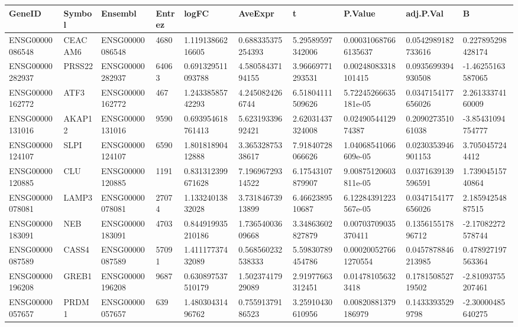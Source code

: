 \begingroup
\tiny
\setlength{\tabcolsep}{2pt}
\renewcommand{\arraystretch}{1.18}
\begin{tabular}{@{}llllllllll@{}}
\toprule
GeneID & Symbol & Ensembl & Entrez & logFC & AveExpr & t & P.Value & adj.P.Val & B \\
\midrule
ENSG00000086548 & CEACAM6 & ENSG00000086548 & 4680 & 1.11913866216605 & 0.688335375254393 & 5.29589597342006 & 0.000310687666135637 & 0.0542989182733616 & 0.227895298428174 \\
ENSG00000282937 & PRSS22 & ENSG00000282937 & 64063 & 0.691329511093788 & 4.58058437194155 & 3.96669771293531 & 0.00248083318101415 & 0.0935699394930508 & -1.46255163587065 \\
ENSG00000162772 & ATF3 & ENSG00000162772 & 467 & 1.24338585742293 & 4.2450824266744 & 6.51804111509626 & 5.72245266635181e-05 & 0.0347154177656026 & 2.26133374160009 \\
ENSG00000131016 & AKAP12 & ENSG00000131016 & 9590 & 0.693954618761413 & 5.62319339692421 & 2.62031437324008 & 0.0249054412974387 & 0.209027351061038 & -3.85431094754777 \\
ENSG00000124107 & SLPI & ENSG00000124107 & 6590 & 1.80181890412888 & 3.36532875338617 & 7.91840728066626 & 1.04068541066609e-05 & 0.0230353946901153 & 3.7050457244412 \\
ENSG00000120885 & CLU & ENSG00000120885 & 1191 & 0.831312399671628 & 7.19696729314522 & 6.17543107879907 & 9.00875120603811e-05 & 0.0371639139596591 & 1.73904515740864 \\
ENSG00000078081 & LAMP3 & ENSG00000078081 & 27074 & 1.13324013832028 & 3.73184673913899 & 6.4662389510687 & 6.12284391223567e-05 & 0.0347154177656026 & 2.18594254887515 \\
ENSG00000183091 & NEB & ENSG00000183091 & 4703 & 0.844919935210186 & 1.73654003609668 & 3.34863602827879 & 0.00703709035370411 & 0.135615517896712 & -2.17082272578744 \\
ENSG00000087589 & CASS4 & ENSG00000087589 & 57091 & 1.41117737432089 & 0.568560232538333 & 5.59830789454786 & 0.000200527661270554 & 0.0457878846213985 & 0.478927197563364 \\
ENSG00000196208 & GREB1 & ENSG00000196208 & 9687 & 0.630897537510179 & 1.50237417929089 & 2.91977663312451 & 0.014781056323418 & 0.178150852719502 & -2.81093755207461 \\
ENSG00000057657 & PRDM1 & ENSG00000057657 & 639 & 1.48030431496762 & 0.75591379186523 & 3.25910430610956 & 0.00820881379186979 & 0.14333935299798 & -2.30000485640275 \\

\end{tabular}
